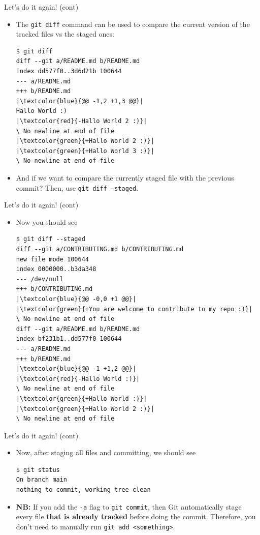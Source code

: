 \documentclass[
hyperref={bookmarks=false},
xcolor={dvipsnames,svgnames*,x11names*}, 
12pt
]{beamer}
\begin{document}
\begin{frame}[fragile]{Let's do it again! (cont)}
\vspace{-0.5cm}
\begin{itemize}
\itemsep 2ex
\item The \texttt{git diff} command can be used to compare the current version of the tracked files vs the staged ones: 
\begin{lstlisting}
$ git diff
diff --git a/README.md b/README.md
index dd577f0..3d6d21b 100644
--- a/README.md
+++ b/README.md
|\textcolor{blue}{@@ -1,2 +1,3 @@}|
Hallo World :)
|\textcolor{red}{-Hallo World 2 :)}|
\ No newline at end of file
|\textcolor{green}{+Hallo World 2 :)}|
|\textcolor{green}{+Hallo World 3 :)}|
\ No newline at end of file
\end{lstlisting}
\item And if we want to compare the currently staged file with the previous commit? Then, use \texttt{git diff --staged}. 
\end{itemize}
\end{frame}

\begin{frame}[fragile]{Let's do it again! (cont)}
\vspace{-0.5cm}
\begin{itemize}
\itemsep 2ex
\item Now you should see
\begin{lstlisting}
$ git diff --staged
diff --git a/CONTRIBUTING.md b/CONTRIBUTING.md
new file mode 100644
index 0000000..b3da348
--- /dev/null
+++ b/CONTRIBUTING.md
|\textcolor{blue}{@@ -0,0 +1 @@}|
|\textcolor{green}{+You are welcome to contribute to my repo :)}|
\ No newline at end of file
diff --git a/README.md b/README.md
index bf231b1..dd577f0 100644
--- a/README.md
+++ b/README.md
|\textcolor{blue}{@@ -1 +1,2 @@}|
|\textcolor{red}{-Hallo World :)}|
\ No newline at end of file
|\textcolor{green}{+Hallo World :)}|
|\textcolor{green}{+Hallo World 2 :)}|
\ No newline at end of file
\end{lstlisting}
\end{itemize}
\end{frame}

\begin{frame}[fragile]{Let's do it again! (cont)}
\vspace{-0.5cm}
\begin{itemize}
\itemsep 2ex
\item Now, after staging all files and committing, we should see 
\begin{lstlisting}
$ git status
On branch main
nothing to commit, working tree clean
\end{lstlisting}
\item \textbf{NB:} If you add the \texttt{-a} flag to \texttt{git commit}, then Git automatically stage every file \textbf{that is already tracked} before doing the commit. Therefore, you don't need to manually run \texttt{git add <something>}. 
\end{itemize}
\end{frame}
\end{document}
